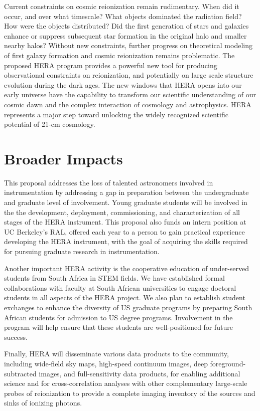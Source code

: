 \documentclass[preprint]{aastex}
\begin{document}
Current constraints on cosmic reionization remain rudimentary. When did it
occur, and over what timescale?  What objects dominated the radiation field?
How were the objects distributed? Did the first generation of stars and galaxies
enhance or suppress subsequent star formation in the
original halo and smaller nearby halos? Without new constraints, further
progress on theoretical modeling of first galaxy formation and cosmic
reionization remains problematic.  The proposed HERA program provides a
powerful new tool for producing observational constraints on reionization, and
potentially on large scale structure evolution during the dark ages.  The new
windows that HERA opens into our early universe have the capability to
transform our scientific understanding of our cosmic dawn and the complex interaction of cosmology
and astrophysics.  HERA represents a major step toward unlocking the widely recognized scientific potential of
21-cm cosmology.

\section*{Broader Impacts}

This proposal addresses the loss of talented astronomers involved in
instrumentation by addressing a gap in preparation between the undergraduate
and graduate level of involvement.  Young graduate students will be involved
in the the development,
deployment, commissioning, and characterization of all stages of the HERA
instrument. This proposal also funds an intern
position at UC Berkeley's RAL, offered each year to a person to gain
practical experience developing
the HERA instrument, with the goal of acquiring the skills required for
pursuing graduate research in instrumentation.

Another important HERA activity is the cooperative education of
under-served students from South Africa in STEM fields.
We have established formal collaborations
with faculty at South African universities to engage doctoral students in all aspects of the HERA project.
We also plan to establish
student exchanges to enhance
the diversity of US graduate programs by preparing South African students for
admission to US degree programs.
Involvement in the
program will help ensure that these students are well-positioned for
future success.

Finally, HERA will disseminate various data products to the community,
including wide-field sky maps, high-speed continuum images, deep
foreground-subtracted images, and full-sensitivity data products, for enabling
additional science and for cross-correlation analyses with other 
complementary large-scale
probes of reionization to provide a complete imaging inventory of the
sources and sinks of ionizing photons.
\end{document}
